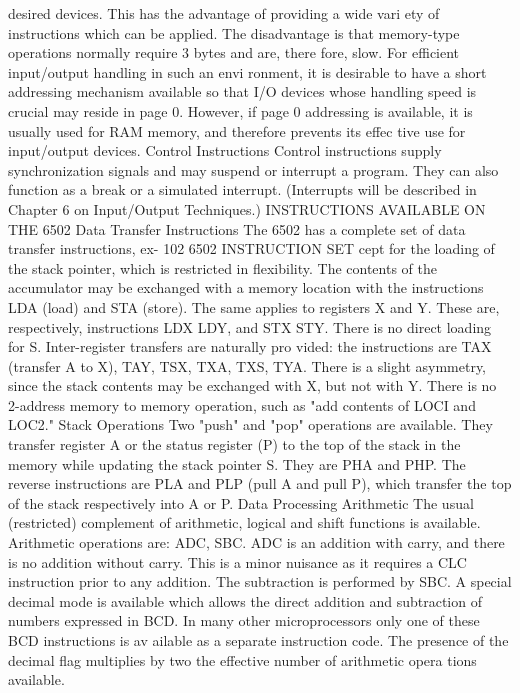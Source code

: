 desired devices. This has the advantage of providing a wide vari
ety of instructions which can be applied. The disadvantage is that
memory-type operations normally require 3 bytes and are, there
fore, slow. For efficient input/output handling in such an envi
ronment, it is desirable to have a short addressing mechanism
available so that I/O devices whose handling speed is crucial may
reside in page 0. However, if page 0 addressing is available, it is
usually used for RAM memory, and therefore prevents its effec
tive use for input/output devices.
Control Instructions
Control instructions supply synchronization signals and may
suspend or interrupt a program. They can also function as a break
or a simulated interrupt. (Interrupts will be described in Chapter
6 on Input/Output Techniques.)
INSTRUCTIONS AVAILABLE ON THE 6502
Data Transfer Instructions
The 6502 has a complete set of data transfer instructions, ex-
102
6502 INSTRUCTION SET
cept for the loading of the stack pointer, which is restricted in
flexibility. The contents of the accumulator may be exchanged
with a memory location with the instructions LDA (load) and
STA (store). The same applies to registers X and Y. These are,
respectively, instructions LDX LDY, and STX STY. There is no
direct loading for S. Inter-register transfers are naturally pro
vided: the instructions are TAX (transfer A to X), TAY, TSX,
TXA, TXS, TYA. There is a slight asymmetry, since the stack
contents may be exchanged with X, but not with Y.
There is no 2-address memory to memory operation, such as "add
contents of LOCI and LOC2."
Stack Operations
Two "push" and "pop" operations are available. They transfer
register A or the status register (P) to the top of the stack in the
memory while updating the stack pointer S. They are PHA and
PHP. The reverse instructions are PLA and PLP (pull A and pull
P), which transfer the top of the stack respectively into A or P.
Data Processing
Arithmetic
The usual (restricted) complement of arithmetic, logical and
shift functions is available. Arithmetic operations are: ADC,
SBC. ADC is an addition with carry, and there is no addition
without carry. This is a minor nuisance as it requires a CLC
instruction prior to any addition. The subtraction is performed by
SBC.
A special decimal mode is available which allows the direct
addition and subtraction of numbers expressed in BCD. In many
other microprocessors only one of these BCD instructions is av
ailable as a separate instruction code. The presence of the decimal
flag multiplies by two the effective number of arithmetic opera
tions available.
